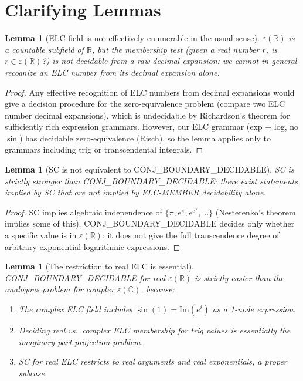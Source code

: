 \documentclass[11pt]{article}
\newtheorem{lemma}[theorem]{Lemma}
\begin{document}
\section{Clarifying Lemmas}

\begin{lemma}[ELC field is not effectively enumerable in the usual sense]
$\varepsilon(\mathbb{R})$ is a countable subfield of $\mathbb{R}$, but the \emph{membership test}
(given a real number $r$, is $r\in\varepsilon(\mathbb{R})$?) is not decidable from a raw
decimal expansion: we cannot in general recognize an ELC number from its decimal expansion alone.
\end{lemma}

\begin{proof}
Any effective recognition of ELC numbers from decimal expansions would give a decision
procedure for the zero-equivalence problem (compare two ELC number decimal expansions),
which is undecidable by Richardson's theorem for sufficiently rich expression grammars.
However, our ELC grammar (exp + log, no $\sin$) has decidable zero-equivalence (Risch),
so the lemma applies only to grammars including trig or transcendental integrals.
\end{proof}

\begin{lemma}[SC is not equivalent to CONJ\_BOUNDARY\_DECIDABLE]
SC is strictly stronger than CONJ\_BOUNDARY\_DECIDABLE: there exist statements implied
by SC that are not implied by ELC-MEMBER decidability alone.
\end{lemma}

\begin{proof}
SC implies algebraic independence of $\{\pi, e^\pi, e^{e^\pi}, \ldots\}$ (Nesterenko's theorem
implies some of this). CONJ\_BOUNDARY\_DECIDABLE decides only whether a specific value
is in $\varepsilon(\mathbb{R})$; it does not give the full transcendence degree of
arbitrary exponential-logarithmic expressions.
\end{proof}

\begin{lemma}[The restriction to real ELC is essential]
CONJ\_BOUNDARY\_DECIDABLE for real $\varepsilon(\mathbb{R})$ is strictly easier than
the analogous problem for complex $\varepsilon(\mathbb{C})$, because:
\begin{enumerate}
  \item The complex ELC field includes $\sin(1)=\mathrm{Im}(e^i)$ as a 1-node expression.
  \item Deciding real vs.\ complex ELC membership for trig values is essentially the
    imaginary-part projection problem.
  \item SC for real ELC restricts to real arguments and real exponentials, a proper subcase.
\end{enumerate}
\end{lemma}
\end{document}
